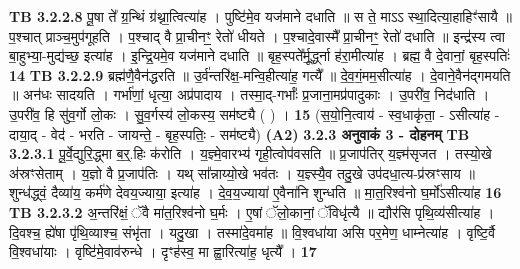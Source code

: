 \documentclass[17pt]{extarticle}
\begin{document}
{{{{{{{{{{{{{{{{{{{                  \newline
                                \textbf{ TB 3.2.2.8} \newline
                  पू॒षा ते᳚ ग्र॒न्थिं ग्र॑थ्ना॒त्वित्या॑ह । पुष्टि॑मे॒व यज॑माने दधाति ॥ स ते॒ माऽऽ स्था॒दित्या॒हाहिꣳ॑सायै ॥ प॒श्चात् प्राञ्च॒मुप॑गूहति । प॒श्चाद् वै प्रा॒चीनꣳ॒॒ रेतो॑ धीयते । प॒श्चादे॒वास्मै᳚ प्रा॒चीनꣳ॒॒ रेतो॑ दधाति ॥ इन्द्र॑स्य त्वा बा॒हुभ्या॒-मुद्य॑च्छ॒ इत्या॑ह । इ॒न्द्रि॒यमे॒व यज॑माने दधाति ॥ बृह॒स्पते᳚र्मू॒र्द्ध्ना ह॑रा॒मीत्या॑ह । ब्रह्म॒ वै दे॒वानां॒ बृह॒स्पतिः॑ \textbf{ 14} \newline
                  \newline
                                \textbf{ TB 3.2.2.9} \newline
                  ब्रह्म॑णै॒वैन॑द्धरति ॥ उ॒र्व॑न्तरि॑क्ष॒-मन्वि॒हीत्या॑ह॒ गत्यै᳚ ॥ दे॒व॒गं॒मम॒सीत्या॑ह । दे॒वाने॒वैन॑द्गमयति ॥ अन॑धः सादयति । गर्भा॑णां॒ धृत्या॒ अप्र॑पादाय । तस्मा॒द्-गर्भाः᳚ प्र॒जाना॒मप्र॑पादुकाः । उ॒परी॑व॒ निद॑धाति । उ॒परी॑व॒ हि सु॑व॒र्गो लो॒कः । सु॒व॒र्गस्य॑ लो॒कस्य॒ सम॑ष्ट्यै ( ) । \textbf{ 15} \newline
                  \newline
                                    (स॒यो॒नि॒त्वाय॑ - स्व॒धाकृ॑ता॒ - ऽसीत्या॑ह - दाया॒द् - वेद॑ - भरति - जायन्ते॒ - बृह॒स्पतिः॒ - सम॑ष्ट्यै) \textbf{(A2)} \newline \newline
                \textbf{ 3.2.3     अनुवाकं   3 - दोहनम्} \newline
                                \textbf{ TB 3.2.3.1} \newline
                  पू॒र्वे॒द्युरि॒द्ध्मा ब॒र्॒.हिः क॑रोति । य॒ज्ञ्मे॒वारभ्य॑ गृही॒त्वोप॑वसति ॥ प्र॒जाप॑तिर् य॒ज्ञ्म॑सृजत । तस्यो॒खे अ॑स्रꣳसेताम् । य॒ज्ञो वै प्र॒जाप॑तिः । यथ् सा᳚न्नाय्यो॒खे भव॑तः । य॒ज्ञ्स्यै॒व तदु॒खे उप॑दधा॒त्य-प्र॑स्रꣳसाय ॥ शुन्ध॑द्ध्वं॒ दैव्या॑य॒ कर्म॑णे देवय॒ज्याया॒ इत्या॑ह । दे॒व॒य॒ज्याया॑ ए॒वैना॑नि शुन्धति ॥ मा॒त॒रिश्व॑नो घ॒र्मो॑ऽसीत्या॑ह \textbf{ 16} \newline
                  \newline
                                \textbf{ TB 3.2.3.2} \newline
                  अ॒न्तरि॑क्षं॒ ॅवै मा॑त॒रिश्व॑नो घ॒र्मः । ए॒षां ॅलो॒कानां॒ ॅविधृ॑त्यै ॥ द्यौर॑सि पृथि॒व्य॑सीत्या॑ह । दि॒वश्च॒ ह्ये॑षा पृ॑थि॒व्याश्च॒ संभृ॑ता । यदु॒खा । तस्मा॑दे॒वमा॑ह ॥ वि॒श्वधा॑या असि पर॒मेण॒ धाम्नेत्या॑ह । वृष्टि॒र्वै वि॒श्वधा॑याः । वृष्टि॑मे॒वाव॑रुन्धे । दृꣳह॑स्व॒ मा ह्वा॒रित्या॑ह॒ धृत्यै᳚ । \textbf{ 17} \newline
}}}}}}}}}}}}}}}}}}}
\end{document}
